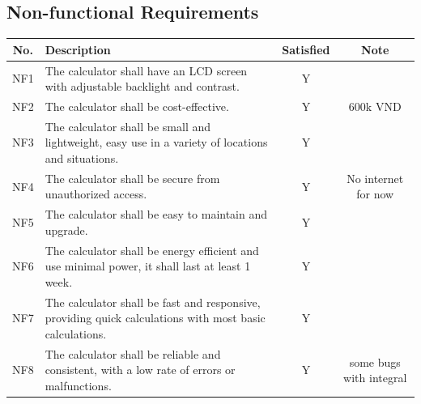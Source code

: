 \documentclass[a4paper, twoside]{report}
\begin{document}
\subsection{Non-functional Requirements}
\begin{table}[H]
\centering
\begin{tabular}{|c{}|p{}|c{}|c{}|}
\hline
\textbf{No.} & \textbf{Description} & \textbf{Satisfied} & \textbf{Note} \\ \hline
NF1  & The calculator shall have an LCD screen with adjustable backlight and contrast.                                                                                               & Y &                         \\ \hline
NF2  & The calculator shall be cost-effective.                                                                                                                                       & Y & 600k VND                \\ \hline
NF3  & The calculator shall be small and lightweight, easy use in a variety of locations and situations.                                                                             & Y &                         \\ \hline
NF4  & The calculator shall be secure from unauthorized access.                                                                                                                      & Y & No internet for now     \\ \hline
NF5  & The calculator shall be easy to maintain and upgrade.                                                                                                                         & Y &                         \\ \hline
NF6  & The calculator shall be energy efficient and use minimal power, it shall last at least 1 week.                                                                                & Y &                         \\ \hline
NF7  & The calculator shall be fast and responsive, providing quick calculations with most basic calculations.                                                                       & Y &                         \\ \hline
NF8  & The calculator shall be reliable and consistent, with a low rate of errors or malfunctions.                                                                                   & Y & some bugs with integral \\ \hline

\end{tabular}
\end{table}
\end{document}
